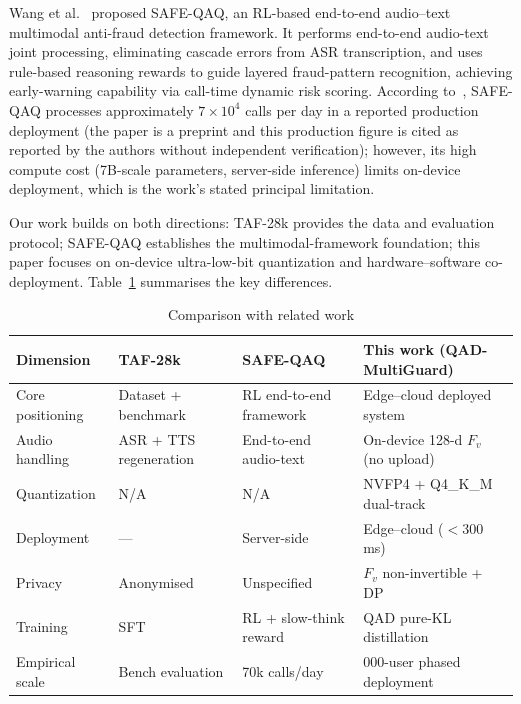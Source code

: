 \documentclass[11pt, a4paper]{article}
\begin{document}
Wang et al.~\cite{2} proposed SAFE-QAQ, an RL-based end-to-end audio--text multimodal anti-fraud detection framework. It performs end-to-end audio-text joint processing, eliminating cascade errors from ASR transcription, and uses rule-based reasoning rewards to guide layered fraud-pattern recognition, achieving early-warning capability via call-time dynamic risk scoring. According to~\cite{2}, SAFE-QAQ processes approximately $7\times10^4$ calls per day in a reported production deployment (the paper is a preprint and this production figure is cited as reported by the authors without independent verification); however, its high compute cost (7B-scale parameters, server-side inference) limits on-device deployment, which is the work's stated principal limitation.

Our work builds on both directions: TAF-28k provides the data and evaluation protocol; SAFE-QAQ establishes the multimodal-framework foundation; this paper focuses on on-device ultra-low-bit quantization and hardware--software co-deployment. Table~\ref{tab1} summarises the key differences.

\begin{table}[htbp]
\centering\small
\caption{Comparison with related work}
\label{tab1}
\renewcommand{\arraystretch}{1.15}
\setlength{\tabcolsep}{6pt}
\begin{tabular}{>{\centering\arraybackslash}m{2.2cm}>{\raggedright\arraybackslash}m{3.5cm}>{\raggedright\arraybackslash}m{3.5cm}>{\raggedright\arraybackslash}m{5cm}}
\toprule
\textbf{Dimension} & \textbf{TAF-28k~\cite{1}} & \textbf{SAFE-QAQ~\cite{2}} & \textbf{This work (QAD-MultiGuard)} \\
\midrule
Core positioning & Dataset + benchmark & RL end-to-end framework & Edge--cloud deployed system \\
Audio handling & ASR + TTS regeneration & End-to-end audio-text & On-device 128-d $F_v$ (no upload) \\
Quantization & N/A & N/A & NVFP4 + Q4\_K\_M dual-track \\
Deployment & --- & Server-side & Edge--cloud ($<$300 ms) \\
Privacy & Anonymised & Unspecified & $F_v$ non-invertible + DP \\
Training & SFT & RL + slow-think reward & QAD pure-KL distillation \\
Empirical scale & Bench evaluation & 70k calls/day & 5{,}000-user phased deployment \\
\bottomrule
\end{tabular}
\end{table}
\end{document}
